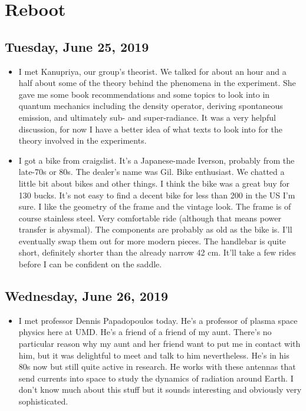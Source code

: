 \documentclass{book}
\theoremstyle{definition}
\begin{document}
\chapter{Reboot}
\section*{Tuesday, June 25, 2019}
\begin{itemize}
	\item I met Kanupriya, our group's theorist. We talked for about an hour and a half about some of the theory behind the phenomena in the experiment. She gave me some book recommendations and some topics to look into in quantum mechanics including the density operator, deriving spontaneous emission, and ultimately sub- and super-radiance. It was a very helpful discussion, for now I have a better idea of what texts to look into for the theory involved in the experiments. 
	
	\item I got a bike from craigslist. It's a Japanese-made Iverson, probably from the late-70s or 80s. The dealer's name was Gil. Bike enthusiast. We chatted a little bit about bikes and other things. I think the bike was a great buy for 130 bucks. It's not easy to find a decent bike for less than 200 in the US I'm sure. I like the geometry of the frame and the vintage look. The frame is of course stainless steel. Very comfortable ride (although that means power transfer is abysmal). The components are probably as old as the bike is. I'll eventually swap them out for more modern pieces. The handlebar is quite short, definitely shorter than the already narrow 42 cm. It'll take a few rides before I can be confident on the saddle.   
\end{itemize}

\section*{Wednesday, June 26, 2019}
\begin{itemize}
	\item I met professor Dennis Papadopoulos today. He's a professor of plasma space physics here at UMD. He's a friend of a friend of my aunt. There's no particular reason why my aunt and her friend want to put me in contact with him, but it was delightful to meet and talk to him nevertheless. He's in his 80s now but still quite active in research. He works with these antennas that send currents into space to study the dynamics of radiation around Earth. I don't know much about this stuff but it sounds interesting and obviously very sophisticated. 
\end{itemize}
\end{document}
